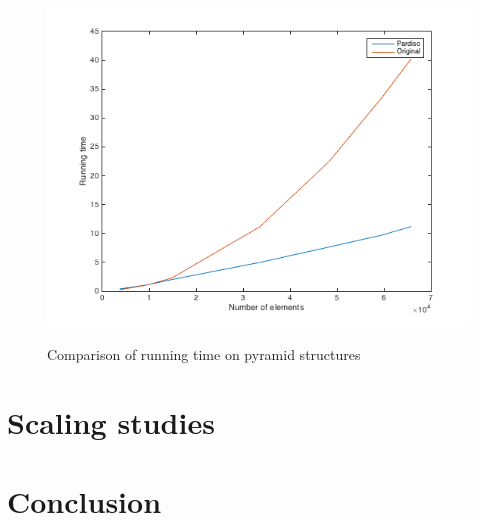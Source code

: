 \documentclass[11pt]{article}
\begin{document}
\begin{figure}[H]
\begin{center}

\caption{Comparison of running time on pyramid structures}
\includegraphics[width=12cm]{pyrplot}
\label{fig:pyr_comp}
\end{center}
\end{figure}



\section{Scaling studies}

\section{Conclusion}
\end{document}
